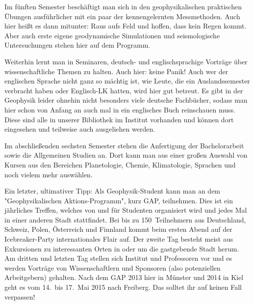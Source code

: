 \begin{multicols}{2}
Im fünften Semester beschäftigt man sich in den geophysikalischen praktischen Übungen ausführlicher mit ein paar der kennengelernten Messmethoden. Auch hier heißt es dann mitunter: Raus aufs Feld und hoffen, dass kein Regen kommt. Aber auch erste eigene geodynamische Simulationen und seismologische Untersuchungen stehen hier auf dem Programm.

Weiterhin lernt man in Seminaren, deutsch- und englischsprachige Vorträge über wissenschaftliche Themen zu halten. Auch hier: keine Panik! Auch wer der englischen Sprache nicht ganz so mächtig ist, wie Leute, die ein Auslandssemester verbracht haben oder Englisch-LK hatten, wird hier gut betreut. Es gibt in der Geophysik leider ohnehin nicht besonders viele deutsche Fachbücher, sodass man hier schon von Anfang an auch mal in ein englisches Buch reinschauen muss. Diese sind alle in unserer Bibliothek im Institut vorhanden und können dort eingesehen und teilweise auch ausgeliehen werden.

Im abschließenden sechsten Semester stehen die Anfertigung der Bachelorarbeit sowie die Allgemeinen Studien an. Dort kann man aus einer großen Auswahl von Kursen aus den Bereichen Planetologie, Chemie, Klimatologie, Sprachen und noch vielem mehr auswählen.

Ein letzter, ultimativer Tipp: Als Geophysik-Student kann man an dem "Geophysikalischen Aktions-Programm", kurz GAP, teilnehmen. Dies ist ein jährliches Treffen, welches von und für Studenten organisiert wird und jedes Mal in einer anderen Stadt stattfindet. Bei bis zu 150~Teilnehmern aus Deutschland, Schweiz, Polen, Österreich und Finnland kommt beim ersten Abend auf der Icebreaker-Party internationales Flair auf. Der zweite Tag besteht meist aus Exkursionen zu interessanten Orten in oder um die gastgebende Stadt herum. Am dritten und letzten Tag stellen sich Institut und Professoren vor und es werden Vorträge von Wissenschaftlern und Sponsoren (also potenziellen Arbeitgebern) gehalten. Nach dem GAP 2013 hier in Münster und 2014 in Kiel geht es vom 14.\ bis 17.\ Mai 2015 nach Freiberg. Das solltet ihr auf keinen Fall verpassen!

\end{multicols}

